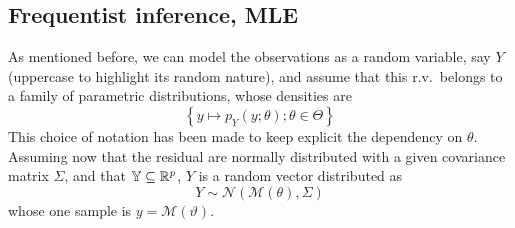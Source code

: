 \documentclass[../../Main_ManuscritThese.tex]{subfiles}
\begin{document}
\subsection{Frequentist inference, MLE}
\label{sec:frequentist_inference_MLE}
As mentioned before, we can model the observations as a random variable, say $Y$ (uppercase to highlight its random nature), and assume that this r.v.\ belongs to a family of parametric distributions, whose densities are
\begin{equation}
  \label{eq:family_pdf}
  \left\{y\mapsto p_{Y}(y; \theta) ; \theta\in\Theta \right\}
\end{equation}
This choice of notation has been made to keep explicit the dependency on $\theta$. Assuming now that the residual are normally distributed with a given covariance matrix $\Sigma$, and that $\mathbb{Y} \subseteq \mathbb{R}^p$, $Y$ is a random vector distributed as
\begin{equation}
  \label{eq:lik_gaussian}
  Y  \sim \mathcal{N}(\mathcal{M}(\theta), \Sigma)
\end{equation}
whose one sample is $y=\mathscr{M}(\vartheta)$.
\end{document}
